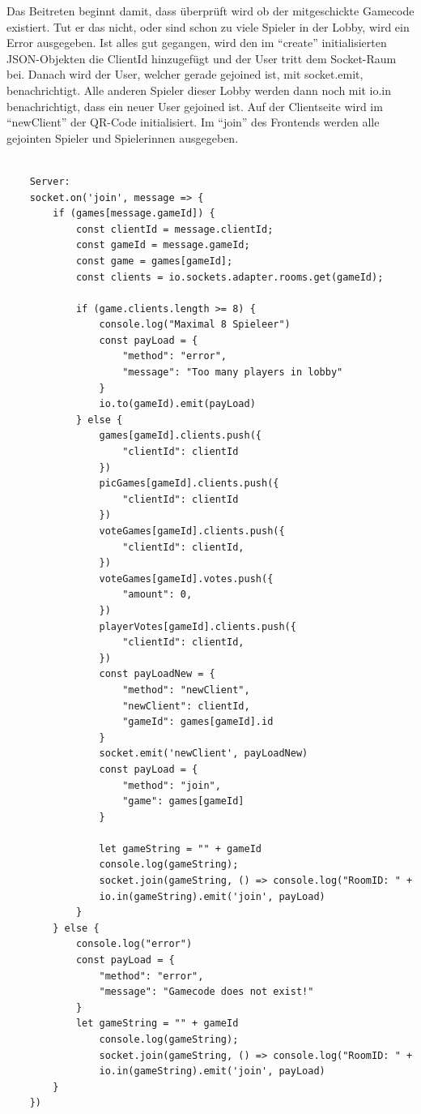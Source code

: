 Das Beitreten beginnt damit, dass überprüft wird ob der mitgeschickte Gamecode existiert.
Tut er das nicht, oder sind schon zu viele Spieler in der Lobby, wird ein Error ausgegeben. Ist alles gut gegangen, wird den im ``create'' initialisierten JSON-Objekten die ClientId hinzugefügt und der User tritt dem Socket-Raum bei. Danach wird der User, welcher gerade gejoined ist, mit socket.emit,
benachrichtigt. Alle anderen Spieler dieser Lobby werden dann noch mit io.in benachrichtigt,
dass ein neuer User gejoined ist. Auf der Clientseite wird im ``newClient'' der QR-Code initialisiert. 
Im ``join'' des Frontends werden alle gejointen Spieler und Spielerinnen ausgegeben. 
\begin{lstlisting}[language=html,caption=Join Game]
    
    Server:
    socket.on('join', message => {
        if (games[message.gameId]) {
            const clientId = message.clientId;
            const gameId = message.gameId;
            const game = games[gameId];
            const clients = io.sockets.adapter.rooms.get(gameId);

            if (game.clients.length >= 8) {
                console.log("Maximal 8 Spieleer")
                const payLoad = {
                    "method": "error",
                    "message": "Too many players in lobby"
                }
                io.to(gameId).emit(payLoad)
            } else {
                games[gameId].clients.push({
                    "clientId": clientId
                })
                picGames[gameId].clients.push({
                    "clientId": clientId
                })
                voteGames[gameId].clients.push({
                    "clientId": clientId,
                })
                voteGames[gameId].votes.push({
                    "amount": 0,
                })
                playerVotes[gameId].clients.push({
                    "clientId": clientId,
                })
                const payLoadNew = {
                    "method": "newClient",
                    "newClient": clientId,
                    "gameId": games[gameId].id
                }
                socket.emit('newClient', payLoadNew)
                const payLoad = {
                    "method": "join",
                    "game": games[gameId]
                }

                let gameString = "" + gameId
                console.log(gameString);
                socket.join(gameString, () => console.log("RoomID: " + socket.rooms))
                io.in(gameString).emit('join', payLoad)
            }
        } else {
            console.log("error")
            const payLoad = {
                "method": "error",
                "message": "Gamecode does not exist!"
            }
            let gameString = "" + gameId
                console.log(gameString);
                socket.join(gameString, () => console.log("RoomID: " + socket.rooms))
                io.in(gameString).emit('join', payLoad)
        }
    })



\end{lstlisting}
